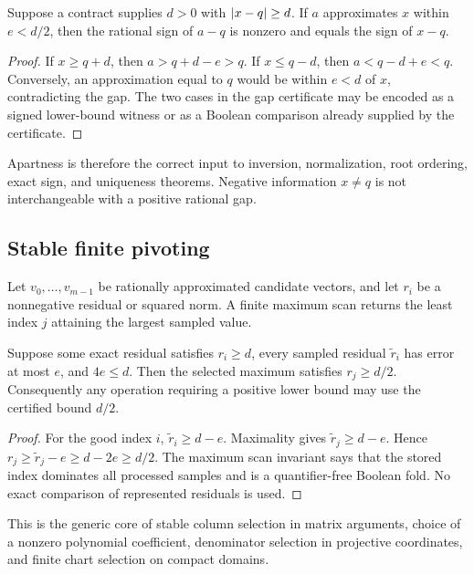 \begin{theorem}
\label{thm:exact-gap}
Suppose a contract supplies \(d>0\) with
\(\left|x-q\right|\ge d\).  If \(a\) approximates \(x\) within \(e<d/2\), then the
rational sign of \(a-q\) is nonzero and equals the sign of \(x-q\).
\end{theorem}

\begin{proof}
If \(x\ge q+d\), then \(a>q+d-e>q\).  If
\(x\le q-d\), then \(a<q-d+e<q\).  Conversely, an approximation equal to
\(q\) would be within \(e<d\) of \(x\), contradicting the gap.  The two cases
in the gap certificate may be encoded as a signed lower-bound witness or as a
Boolean comparison already supplied by the certificate.
\end{proof}

Apartness is therefore the correct input to inversion, normalization, root
ordering, exact sign, and uniqueness theorems.  Negative information
\(x\ne q\) is not interchangeable with a positive rational gap.

\subsection{Stable finite pivoting}

Let \(v_0,\ldots,v_{m-1}\) be rationally approximated candidate vectors, and
let \(r_i\) be a nonnegative residual or squared norm.  A finite maximum scan
returns the least index \(j\) attaining the largest sampled value.

\begin{lemma}
\label{lem:robust-pivot}
Suppose some exact residual satisfies \(r_i\ge d\), every sampled residual
\(\tilde r_i\) has error at most \(e\), and \(4e\le d\).  Then the selected
maximum satisfies \(r_j\ge d/2\).  Consequently any operation requiring a
positive lower bound may use the certified bound \(d/2\).
\end{lemma}

\begin{proof}
For the good index \(i\), \(\tilde r_i\ge d-e\).  Maximality gives
\(\tilde r_j\ge d-e\).  Hence
\(r_j\ge\tilde r_j-e\ge d-2e\ge d/2\).  The maximum scan invariant says that
the stored index dominates all processed samples and is a quantifier-free
Boolean fold.  No exact comparison of represented residuals is used.
\end{proof}

This is the generic core of stable column selection in matrix arguments,
choice of a nonzero polynomial coefficient, denominator selection in projective
coordinates, and finite chart selection on compact domains.

